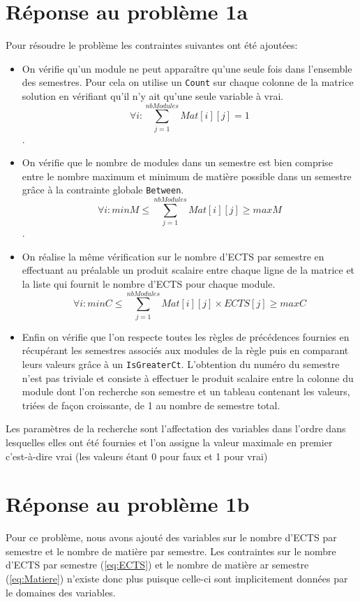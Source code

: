 \documentclass[a4paper]{article}
\begin{document}
\section{Réponse au problème 1a}
Pour résoudre le problème les contraintes suivantes ont été ajoutées:
\begin{itemize}
\item On vérifie qu'un module ne peut apparaître qu'une seule fois dans l'ensemble des semestres. Pour cela on utilise un \verb+Count+ sur chaque colonne de la matrice solution en vérifiant qu'il n'y ait qu'une seule variable à vrai. \begin{equation}  \forall i: \sum_{j=1}^{nbModules}Mat[i][j] = 1 \end{equation}.
\item On vérifie que le nombre de modules dans un semestre est bien comprise entre le nombre maximum et minimum de matière possible dans un semestre grâce à la contrainte globale \verb+Between+.\begin{equation}\label{eq:Matiere}\forall{i}:  minM \leq \sum_{j=1}^{nbModules}Mat[i][j] \geq maxM\end{equation}.
\item On réalise la même vérification sur le nombre d'ECTS par semestre en effectuant au préalable un produit scalaire entre chaque ligne de la matrice et la liste qui fournit le nombre d'ECTS pour chaque module.\begin{equation}\label{eq:ECTS}\forall{i}:  minC \leq \sum_{j=1}^{nbModules} {{Mat[i][j]} \times ECTS[j]} \geq maxC\end{equation}
\item Enfin on vérifie que l'on respecte toutes les règles de précédences fournies en récupérant les semestres associés aux modules de la règle puis en comparant leurs valeurs grâce à un \verb+IsGreaterCt+. L'obtention du numéro du semestre n'est pas triviale et consiste à effectuer le produit scalaire entre la colonne du module dont l'on recherche son semestre et un tableau contenant les valeurs, triées de façon croissante, de 1 au nombre de semestre total.
\end{itemize}
Les paramètres de la recherche sont l'affectation des variables dans l'ordre dans lesquelles elles ont été fournies et l'on assigne la valeur maximale en premier c'est-à-dire vrai (les valeurs étant 0 pour faux et 1 pour vrai)

\section{Réponse au problème 1b}
Pour ce problème, nous avons ajouté des variables sur le nombre d'ECTS par semestre et le nombre de matière par semestre.
Les contraintes sur le nombre d'ECTS par semestre (\ref{eq:ECTS}) et le nombre de matière ar semestre (\ref{eq:Matiere}) n'existe donc plus puisque celle-ci sont implicitement données par le domaines des variables.
\end{document}
